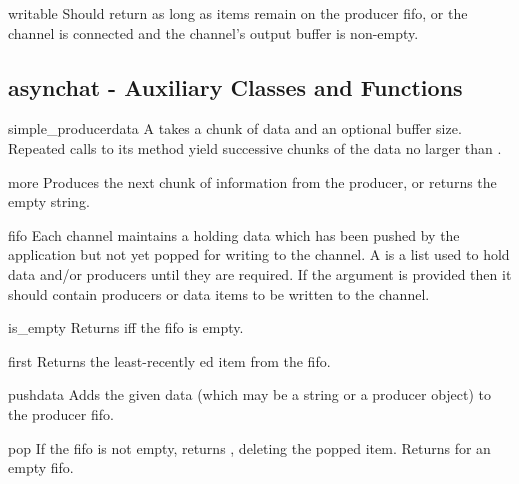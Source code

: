 \begin{methoddesc}{writable}{}
  Should return  as long as items remain on the producer fifo,
  or the channel is connected and the channel's output buffer is non-empty.
\end{methoddesc}

\subsection{asynchat - Auxiliary Classes and Functions}

\begin{classdesc}{simple_producer}{data}
  A  takes a chunk of data and an optional buffer size.
  Repeated calls to its  method yield successive chunks of the
  data no larger than .
\end{classdesc}

\begin{methoddesc}{more}{}
  Produces the next chunk of information from the producer, or returns the empty string.
\end{methoddesc}

\begin{classdesc}{fifo}{}
  Each channel maintains a  holding data which has been pushed by the
  application but not yet popped for writing to the channel.
  A  is a list used to hold data and/or producers until they are required.
  If the  argument is provided then it should contain producers or
  data items to be written to the channel.
\end{classdesc}

\begin{methoddesc}{is_empty}{}
  Returns  iff the fifo is empty.
\end{methoddesc}

\begin{methoddesc}{first}{}
  Returns the least-recently ed item from the fifo.
\end{methoddesc}

\begin{methoddesc}{push}{data}
  Adds the given data (which may be a string or a producer object) to the
  producer fifo.
\end{methoddesc}

\begin{methoddesc}{pop}{}
  If the fifo is not empty, returns , deleting the popped
  item. Returns  for an empty fifo.
\end{methoddesc}


